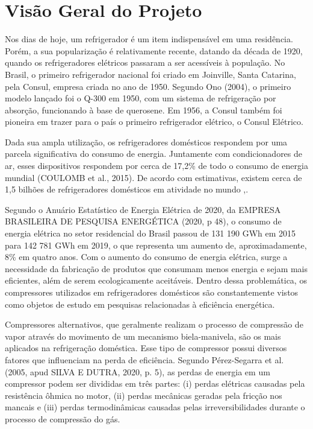 \chapter{Visão Geral do Projeto}

Nos dias de hoje, um refrigerador é um item indispensável em uma residência. Porém, a sua popularização é relativamente recente, datando da década de 1920, quando os refrigeradores elétricos passaram a ser acessíveis à população. No Brasil, o primeiro refrigerador nacional foi criado em Joinville, Santa Catarina, pela Consul, empresa criada no ano de 1950. Segundo Ono (2004), o primeiro modelo lançado foi o Q-300 em 1950, com um sistema de refrigeração por absorção, funcionando à base de querosene. Em 1956, a Consul também foi pioneira em trazer para o país o primeiro refrigerador elétrico, o Consul Elétrico.

Dada sua ampla utilização, os refrigeradores domésticos respondem por uma parcela significativa do consumo de energia. Juntamente com condicionadores de ar, esses dispositivos respondem por cerca de 17,2\% de todo o consumo de energia mundial (COULOMB et al., 2015). De acordo com  estimativas, existem cerca de 1,5 bilhões de refrigeradores domésticos em atividade no mundo \cite{refrigeration-ademe},.

Segundo o Anuário Estatístico de Energia Elétrica de 2020, da EMPRESA BRASILEIRA DE PESQUISA ENERGÉTICA (2020, p 48), o consumo de energia elétrica no setor residencial do Brasil passou de 131 190 GWh em 2015 para 142 781 GWh em 2019, o que representa um aumento de, aproximadamente, 8\% em quatro anos. Com o aumento do consumo de energia elétrica, surge a necessidade da fabricação de produtos que consumam menos energia e sejam mais eficientes, além de serem ecologicamente aceitáveis. Dentro dessa problemática, os compressores utilizados em refrigeradores domésticos são constantemente vistos como objetos de estudo em pesquisas relacionadas à eficiência energética.

Compressores alternativos, que geralmente realizam o processo de compressão de vapor através do movimento de um mecanismo biela-manivela, são os mais aplicados na refrigeração doméstica. Esse tipo de compressor possui diversos fatores que influenciam na perda de eficiência. Segundo Pérez-Segarra et al. (2005, apud SILVA E DUTRA, 2020, p. 5), as perdas de energia em um compressor podem ser divididas em três partes: (i) perdas elétricas causadas pela resistência ôhmica no motor, (ii) perdas mecânicas geradas pela fricção nos mancais e (iii) perdas termodinâmicas causadas pelas irreversibilidades durante o processo de compressão do gás.

